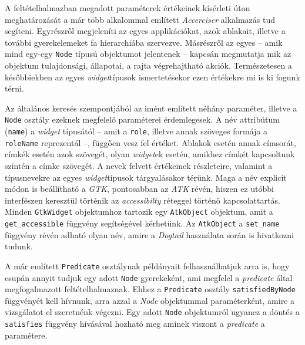 A feltételhalmazban megadott paraméterek értékeinek kísérleti úton meghatározását a már több alkalommal említett \textit{Accerciser} alkalmazás tud segíteni. Egyrészről megjeleníti az egyes applikációkat, azok ablakait, illetve a további gyerekelemeket fa hierarchiába szervezve. Másrészről az egyes -- amik mind egy-egy \texttt{Node} típusú objektumot jelentenek -- kapcsán megmutatja mik az objektum tulajdonsági, állapotai, a rajta végrehajtható akciók. Természetesen a későbbiekben az egyes \textit{widget}típusok ismertetésekor ezen értékekre mi is ki fogunk térni.

Az általános keresés szempontjából az imént említett néhány paraméter, illetve a \texttt{Node} osztály ezeknek megfelelő paraméterei érdemlegesek. A név attribútum (\texttt{name}) a \textit{widget} típusától -- amit a \texttt{role}, illetve annak szöveges formája a \texttt{roleName} reprezentál --, függően vesz fel értéket. Ablakok esetén annak címsorát, címkék esetén azok szövegét, olyan \textit{widget}ek esetén, amikhez címkét kapcsoltunk szintén a címke szövegét. A nevek felvett értékeinek részleteire, valamint a típusnevekre az egyes \textit{widget}típusok tárgyalásakor térünk. Maga a név explicit módon is beállítható a \textit{GTK}, pontosabban az \textit{ATK} révén, hiszen ez utóbbi interfészen keresztül történik az \textit{accessibilty} réteggel történő kapcsolattartás. Minden \texttt{GtkWidget} objektumhoz tartozik egy \texttt{AtkObject} objektum, amit a \texttt{get\_accessible} függvény segítségével kérhetünk. Az \texttt{AtkObject} a \texttt{set\_name} függvény révén adható olyan név, amire a \textit{Dogtail} használata során is hivatkozni tudunk.

A már említett \texttt{Predicate} osztálynak példányait felhasználhatjuk arra is, hogy csupán annyit tudjuk egy adott \texttt{Node} gyerekeként, ami megfelel a \textit{predicate} által megfogalmazott feltételhalmaznak. Ehhez a \texttt{Predicate} osztály \texttt{satisfiedByNode} függvényét kell hívnunk, arra azzal a \textit{Node} objektummal paraméterként, amire a vizsgálatot el szeretnénk végezni. Egy adott \texttt{Node} objektumról ugyanez a döntés a \texttt{satisfies} függvény hívásával hozható meg aminek viszont a \textit{predicate} a paramétere.

